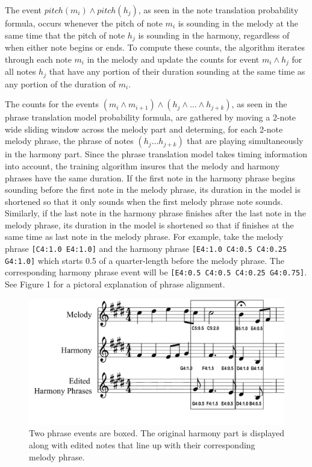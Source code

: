 \documentclass{sig-alternate}
\begin{document}
The event $pitch(m_{i}) \wedge pitch(h_{j})$, as seen in the note translation probability formula, occurs whenever the pitch of note $m_{i}$ is sounding in the melody at the same time that the pitch of note $h_{j}$ is sounding in the harmony, regardless of when either note begins or ends. To compute these counts, the algorithm iterates through each note $m_{i}$ in the melody and update the counts for event $m_{i} \wedge h_{j}$ for all notes $h_{j}$ that have any portion of their duration sounding at the same time as any portion of the duration of $m_{i}$.

The counts for the events $(m_{i} \wedge m_{i+1}) \wedge (h_{j} \wedge \ldots \wedge h_{j+k})$, as seen in the phrase translation model probability formula, are gathered by moving a 2-note wide sliding window across the melody part
and determing, for each 2-note melody phrase, the phrase of notes $(h_{j} \ldots h_{j + k})$ that are playing simultaneously in the harmony part. Since the phrase translation model takes timing information into account, the training algorithm insures that the melody and harmony phrases have the same duration. If the first note in the harmony phrase begins sounding before the first note in the melody phrase, its duration in the model is shortened so that it only sounds when the first melody phrase note sounds. Similarly, if the last note in the harmony phrase finishes after the last note in the melody phrase, its duration in the model is shortened so that if finishes at the same time as last note in the melody phrase. For example, take the melody phrase \texttt{[C4:1.0 E4:1.0]} and the harmony phrase \texttt{[E4:1.0 C4:0.5 C4:0.25 G4:1.0]} which starts 0.5 of a quarter-length before the melody phrase. The corresponding harmony phrase event will be \texttt{[E4:0.5 C4:0.5 C4:0.25 G4:0.75]}. See Figure 1 for a pictoral explanation of phrase alignment.

\begin{figure}
	\includegraphics[scale=0.08]{./phrase_examples.png}
	\caption{Two phrase events are boxed. The original harmony part is displayed along with edited notes that line up with their corresponding melody phrase.}
\end{figure} 
\end{document}
